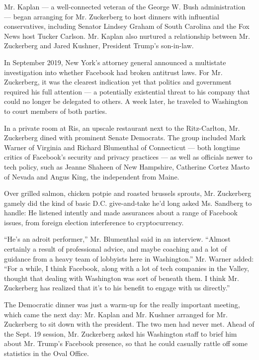 Mr. Kaplan --- a well-connected veteran of the George W. Bush
administration --- began arranging for Mr. Zuckerberg to host dinners
with influential conservatives, including Senator Lindsey Graham of
South Carolina and the Fox News host Tucker Carlson. Mr. Kaplan also
nurtured a relationship between Mr. Zuckerberg and Jared Kushner,
President Trump's son-in-law.

In September 2019, New York's attorney general announced a multistate
investigation into whether Facebook had broken antitrust laws. For Mr.
Zuckerberg, it was the clearest indication yet that politics and
government required his full attention --- a potentially existential
threat to his company that could no longer be delegated to others. A
week later, he traveled to Washington to court members of both parties.

In a private room at Ris, an upscale restaurant next to the
Ritz-Carlton, Mr. Zuckerberg dined with prominent Senate Democrats. The
group included Mark Warner of Virginia and Richard Blumenthal of
Connecticut --- both longtime critics of Facebook's security and privacy
practices --- as well as officials newer to tech policy, such as Jeanne
Shaheen of New Hampshire, Catherine Cortez Masto of Nevada and Angus
King, the independent from Maine.

Over grilled salmon, chicken potpie and roasted brussels sprouts, Mr.
Zuckerberg gamely did the kind of basic D.C. give-and-take he'd long
asked Ms. Sandberg to handle: He listened intently and made assurances
about a range of Facebook issues, from foreign election interference to
cryptocurrency.

``He's an adroit performer,'' Mr. Blumenthal said in an interview.
``Almost certainly a result of professional advice, and maybe coaching
and a lot of guidance from a heavy team of lobbyists here in
Washington.'' Mr. Warner added: ``For a while, I think Facebook, along
with a lot of tech companies in the Valley, thought that dealing with
Washington was sort of beneath them. I think Mr. Zuckerberg has realized
that it's to his benefit to engage with us directly.''

The Democratic dinner was just a warm-up for the really important
meeting, which came the next day: Mr. Kaplan and Mr. Kushner arranged
for Mr. Zuckerberg to sit down with the president. The two men had never
met. Ahead of the Sept. 19 session, Mr. Zuckerberg asked his Washington
staff to brief him about Mr. Trump's Facebook presence, so that he could
casually rattle off some statistics in the Oval Office.

